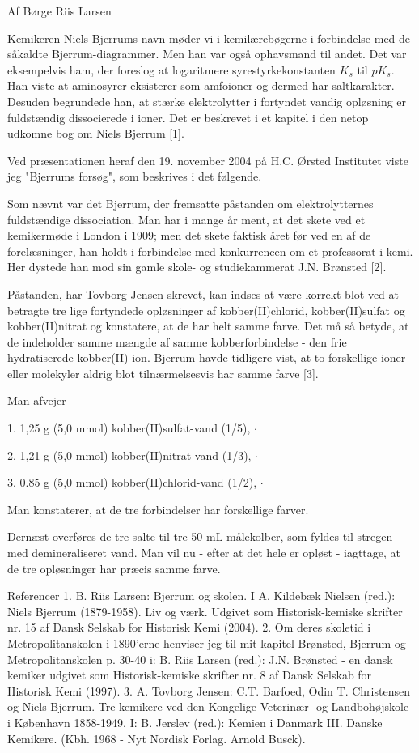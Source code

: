 
Af Børge Riis Larsen

Kemikeren Niels Bjerrums navn møder vi i kemilærebøgerne i forbindelse med de
såkaldte Bjerrum-diagrammer. Men han var også ophavsmand til andet. Det var
eksempelvis ham, der foreslog at logaritmere syrestyrkekonstanten $K_{s}$
til $pK_{s}$.
Han viste at aminosyrer eksisterer som amfoioner og dermed har saltkarakter.
Desuden begrundede han, at stærke elektrolytter i fortyndet vandig opløsning
er fuldstændig dissocierede i ioner. Det er beskrevet i et kapitel i den netop
udkomne bog om Niels Bjerrum [1].

Ved præsentationen heraf den 19. november 2004 på H.C. Ørsted Institutet viste
jeg "Bjerrums forsøg", som beskrives i det følgende.

Som nævnt var det Bjerrum, der fremsatte påstanden om elektrolytternes
fuldstændige dissociation. Man har i mange år ment, at det skete ved et
kemikermøde i London i 1909; men det skete faktisk året før ved en af de
forelæsninger, han holdt i forbindelse med konkurrencen om et professorat i
kemi. Her dystede han mod sin gamle skole- og studiekammerat J.N. Brønsted [2].

Påstanden, har Tovborg Jensen skrevet, kan indses at være korrekt blot ved at
betragte tre lige fortyndede opløsninger af kobber(II)chlorid, kobber(II)sulfat
og kobber(II)nitrat og konstatere, at de har helt samme farve. Det må så betyde,
at de indeholder samme mængde af samme kobberforbindelse - den frie hydratiserede
kobber(II)-ion. Bjerrum havde tidligere vist, at to forskellige ioner eller
molekyler aldrig blot tilnærmelsesvis har samme farve [3].




Man afvejer

1. 1,25 g (5,0 mmol) kobber(II)sulfat-vand (1/5), $\cdotp$

2. 1,21 g (5,0 mmol) kobber(II)nitrat-vand (1/3), $\cdotp$

3. 0.85 g (5,0 mmol) kobber(II)chlorid-vand (1/2), $\cdotp$

Man konstaterer, at de tre forbindelser har forskellige farver.

Dernæst overføres de tre salte til tre 50 mL målekolber, som fyldes til stregen
med demineraliseret vand. Man vil nu - efter at det hele er opløst - iagttage,
at de tre opløsninger har præcis samme farve.

Referencer
1. B. Riis Larsen: Bjerrum og skolen. I A. Kildebæk Nielsen (red.): Niels Bjerrum
(1879-1958). Liv og værk. Udgivet som Historisk-kemiske skrifter nr. 15 af Dansk
Selskab for Historisk Kemi (2004).
2. Om deres skoletid i Metropolitanskolen i 1890'erne henviser jeg til mit
kapitel Brønsted, Bjerrum og Metropolitanskolen p. 30-40 i: B. Riis Larsen (red.):
J.N. Brønsted - en dansk kemiker udgivet som Historisk-kemiske skrifter nr. 8
af Dansk Selskab for Historisk Kemi (1997).
3. A. Tovborg Jensen: C.T. Barfoed, Odin T. Christensen og Niels Bjerrum. Tre
kemikere ved den Kongelige Veterinær- og Landbohøjskole i København 1858-1949. I:
B. Jerslev (red.): Kemien i Danmark III. Danske Kemikere. (Kbh. 1968 - Nyt Nordisk
Forlag. Arnold Busck).
